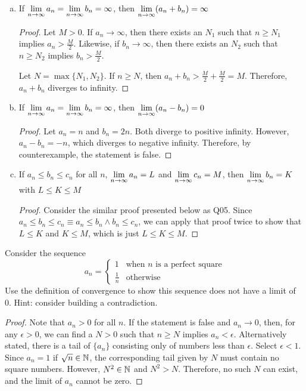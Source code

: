 \documentclass[11pt]{article}
\begin{document}
\begin{enumerate}[(a)]

  \item If $\displaystyle\lim_{n\to\infty}a_n=\displaystyle\lim_{n\to\infty}b_n=\infty$, then $\displaystyle\lim_{n\to\infty}(a_n+b_n)=\infty$
        \begin{proof}
          Let $M>0$. If $a_n\to\infty$, then there exists an $N_1$ such that $n\geq N_1$ implies $a_n>\frac{M}{2}$. Likewise, if $b_n\to\infty$, then there exists an $N_2$ such that $n\geq N_2$ implies $b_n>\frac{M}{2}$.

          Let $N=\max \{N_1,N_2\}$. If $n\geq N$, then $a_n+b_n>\frac{M}{2}+\frac{M}{2}=M$.
          Therefore, $a_n+b_n$ diverges to infinity.
        \end{proof}

  \item If $\displaystyle\lim_{n\to\infty}a_n=\displaystyle\lim_{n\to\infty}b_n=\infty$, then $\displaystyle\lim_{n\to\infty}(a_n-b_n)=0$
        \begin{proof}
          Let $a_n=n$ and $b_n=2n$. Both diverge to positive infinity. However, $a_n-b_n=-n$, which diverges to negative infinity. Therefore, by counterexample, the statement is false.
        \end{proof}

  \item If $a_n \leq b_n \leq c_n$ for all $n$, $\displaystyle\lim_{n\to\infty}a_n=L$ and $\displaystyle\lim_{n\to\infty}c_n=M$, then $\displaystyle\lim_{n\to\infty}b_n=K$ with $L \leq K \leq M$
        \begin{proof}
          Consider the similar proof presented below as Q05.
          Since $a_n \leq b_n \leq c_n \equiv a_n \leq b_n \land b_n \leq c_n$, we can apply that proof twice to show that $L \leq K$ and $K \leq M$, which is just $L \leq K \leq M$.
        \end{proof}

\end{enumerate}



\question
Consider the sequence
\[
  a_n=\begin{cases}
    1           & \textrm{when $n$ is a perfect square} \\
    \frac{1}{n} & \textrm{otherwise}
  \end{cases}
\]
Use the definition of convergence to show this sequence does not have a limit of 0. Hint: consider building a contradiction.
\begin{proof}
  Note that $a_n>0$ for all $n$.
  If the statement is false and $a_n\to 0$, then, for any $\epsilon>0$, we can find a $N>0$ such that $n\geq N$ implies $a_n<\epsilon$.
  Alternatively stated, there is a tail of $\{a_n\}$ consisting only of numbers less than $\epsilon$.
  Select $\epsilon<1$. Since $a_n=1$ if $\sqrt{n}\in\mathbb{N}$, the corresponding tail given by $N$ must contain no square numbers.
  However, $N^2\in\mathbb{N}$ and $N^2>N$. Therefore, no such $N$ can exist, and the limit of $a_n$ cannot be zero.
\end{proof}
\end{document}
